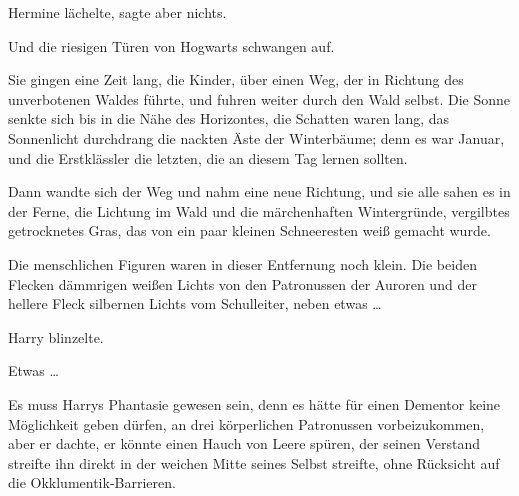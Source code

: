 Hermine lächelte, sagte aber nichts.

Und die riesigen Türen von Hogwarts schwangen auf.

Sie gingen eine Zeit lang, die Kinder, über einen Weg, der in Richtung des unverbotenen Waldes führte, und fuhren weiter durch den Wald selbst. Die Sonne senkte sich bis in die Nähe des Horizontes, die Schatten waren lang, das Sonnenlicht durchdrang die nackten Äste der Winterbäume; denn es war Januar, und die Erstklässler die letzten, die an diesem Tag lernen sollten.

Dann wandte sich der Weg und nahm eine neue Richtung, und sie alle sahen es in der Ferne, die Lichtung im Wald und die märchenhaften Wintergründe, vergilbtes getrocknetes Gras, das von ein paar kleinen Schneeresten weiß gemacht wurde.

Die menschlichen Figuren waren in dieser Entfernung noch klein. Die beiden Flecken dämmrigen weißen Lichts von den Patronussen der Auroren und der hellere Fleck silbernen Lichts vom Schulleiter, neben etwas …

Harry blinzelte.

Etwas …

Es muss Harrys Phantasie gewesen sein, denn es hätte für einen Dementor keine Möglichkeit geben dürfen, an drei körperlichen Patronussen vorbeizukommen, aber er dachte, er könnte einen Hauch von Leere spüren, der seinen Verstand streifte ihn direkt in der weichen Mitte seines Selbst streifte, ohne Rücksicht auf die Okklumentik-Barrieren.

